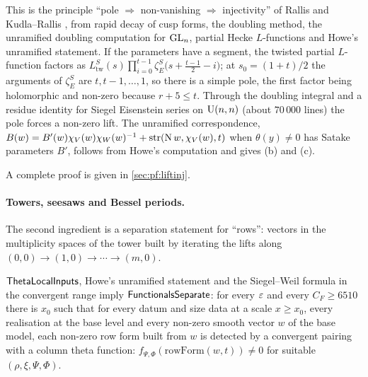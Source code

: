 \begin{proofoutline}
This is the principle ``pole $\Rightarrow$ non-vanishing $\Rightarrow$ injectivity'' of Rallis and
Kudla--Rallis \cite{Rallis1984inj,KudlaRallis1994,GanQiuTakeda2014,Yamana2014}, from rapid decay of cusp forms,
the doubling method, the unramified doubling computation for $\operatorname{GL}_n$, partial Hecke $L$-functions and Howe's
unramified statement. If the parameters have a segment, the twisted partial $L$-function factors as
$L^S_{\mathrm{tw}}(s)\prod_{i=0}^{t-1}\zeta_E^S\bigl(s+\tfrac{t-1}2-i\bigr)$; at $s_0=(1+t)/2$ the arguments
of $\zeta_E^S$ are $t,t-1,\dots,1$, so there is a simple pole, the first factor being holomorphic and non-zero
because $r+5\le t$. Through the doubling integral and a residue identity for Siegel Eisenstein series on
$\operatorname{U}(n,n)$ (about $70\,000$ lines) the pole forces a non-zero lift. The unramified correspondence,
$B(w)=B'(w)\chi_V(w)\chi_W(w)^{-1}+\operatorname{str}(\operatorname{N} w,\chi_V(w),t)$ when $\theta(y)\ne0$ has Satake parameters
$B'$, follows from Howe's computation \cite{Howe1979} and gives (b) and (c).

A complete proof is given in \cref{sec:pf:liftinj}.
\end{proofoutline}

\paragraph{Towers, seesaws and Bessel periods.}
The second ingredient is a separation statement for ``rows'': vectors in the multiplicity spaces of the tower
built by iterating the lifts along $(0,0)\to(1,0)\to\cdots\to(m,0)$.

\begin{proposition}\Fmark\label{prop:families:fs}
$\mathsf{ThetaLocalInputs}$, Howe's unramified statement and the Siegel--Weil formula in the convergent range
imply $\mathsf{FunctionalsSeparate}$: for every $\varepsilon$ and every $C_F\ge6510$ there is $x_0$ such that for every
datum and size data at a scale $x\ge x_0$, every realisation at the base level and every non-zero smooth vector
$w$ of the base model, each non-zero row form built from $w$ is detected by a convergent pairing with a column
theta function: $f_{\Psi,\Phi}(\mathrm{rowForm}(w,t))\neq0$ for suitable $(\rho,\xi,\Psi,\Phi)$.
\end{proposition}


